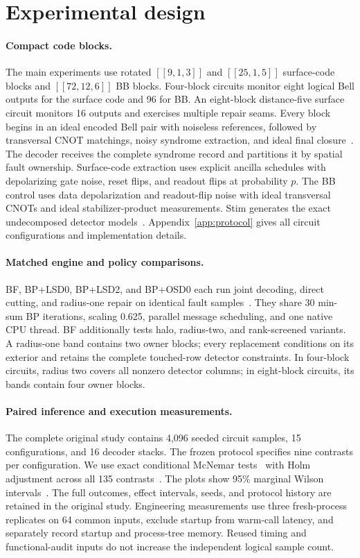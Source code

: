 \section{Experimental design}
\paragraph{Compact code blocks.}
The main experiments use rotated $[[9,1,3]]$ and $[[25,1,5]]$ surface-code blocks and $[[72,12,6]]$ BB blocks. Four-block circuits monitor eight logical Bell outputs for the surface code and 96 for BB. An eight-block distance-five surface circuit monitors 16 outputs and exercises multiple repair seams. Every block begins in an ideal encoded Bell pair with noiseless references, followed by transversal CNOT matchings, noisy syndrome extraction, and ideal final closure~\cite{tour}. The decoder receives the complete syndrome record and partitions it by spatial fault ownership. Surface-code extraction uses explicit ancilla schedules with depolarizing gate noise, reset flips, and readout flips at probability $p$. The BB control uses data depolarization and readout-flip noise with ideal transversal CNOTs and ideal stabilizer-product measurements. Stim generates the exact undecomposed detector models~\cite{stim}. Appendix~\ref{app:protocol} gives all circuit configurations and implementation details.

\paragraph{Matched engine and policy comparisons.}
BF, BP+LSD0, BP+LSD2, and BP+OSD0 each run joint decoding, direct cutting, and radius-one repair on identical fault samples~\cite{bfdocs,lsddocs,osddocs}. They share 30 min-sum BP iterations, scaling 0.625, parallel message scheduling, and one native CPU thread. BF additionally tests halo, radius-two, and rank-screened variants. A radius-one band contains two owner blocks; every replacement conditions on its exterior and retains the complete touched-row detector constraints. In four-block circuits, radius two covers all nonzero detector columns; in eight-block circuits, its bands contain four owner blocks.

\paragraph{Paired inference and execution measurements.}
The complete original study contains 4,096 seeded circuit samples, 15 configurations, and 16 decoder stacks. The frozen protocol specifies nine contrasts per configuration. We use exact conditional McNemar tests~\cite{mcnemar} with Holm adjustment across all 135 contrasts~\cite{holm}. The plots show 95\% marginal Wilson intervals~\cite{wilson}. The full outcomes, effect intervals, seeds, and protocol history are retained in the original study. Engineering measurements use three fresh-process replicates on 64 common inputs, exclude startup from warm-call latency, and separately record startup and process-tree memory. Reused timing and functional-audit inputs do not increase the independent logical sample count.

